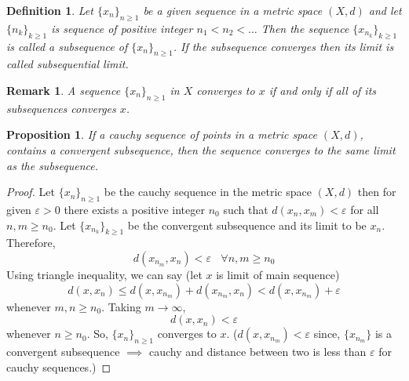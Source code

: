 \documentclass[12pt]{report}
\newtheorem{defn}{Definition}
\newtheorem*{rem}{Remark}
\newtheorem{prop}{Proposition}
\begin{document}
\begin{defn}
    Let $\{x_n\}_{n\geq 1}$ be a given sequence in a metric space $(X,d)$ and let $\{n_k\}_{k\geq 1}$ is sequence of positive integer $n_1 < n_2 < \dots$ Then the sequence $\{x_{n_k}\}_{k \geq 1}$ is called a subsequence of $\{x_n\}_{n\geq 1}$. If the subsequence converges then its limit is called subsequential limit. 
\end{defn}
\begin{rem}
    A sequence $\{x_n\}_{n\geq 1}$ in $X$ converges to $x$ if and only if all of its subsequences converges $x$.
\end{rem}
\begin{prop}
    If a cauchy sequence of points in a metric space $(X,d)$, contains a convergent subsequence, then the sequence converges to the same limit as the subsequence.
\end{prop}
\begin{proof}
    Let $\{x_n\}_{n \geq 1}$ be the cauchy sequence in the metric space $(X,d)$ then for given $\varepsilon > 0$ there exists a positive integer $n_0$ such that $d(x_n , x_m) < \varepsilon$ for all $n,m \geq n_0$. Let $\{x_{n_k}\}_{k \geq 1}$ be the convergent subsequence and its limit to be $x_n$. Therefore,
    $$ d(x_{n_m}, x_n) < \varepsilon~~~~\forall n,m \geq n_0$$
    Using triangle inequality, we can say (let $x$ is limit of main sequence)
    $$ d(x,x_n) \leq d(x, x_{n_m}) + d(x_{n_m}, x_n) < d(x, x_{n_m}) + \varepsilon$$ whenever $m,n \geq n_0$. Taking $m \to \infty$,
    $$ d(x, x_n) < \varepsilon$$ whenever $n \geq n_0$. So, $\{x_n\}_{n\geq 1}$ converges to $x$. ($d(x, x_{n_m}) < \varepsilon$ since, $\{x_{n_m}\}$ is a convergent subsequence $\implies$ cauchy and distance between two is less than $\varepsilon$ for cauchy sequences.)
\end{proof}
\end{document}
